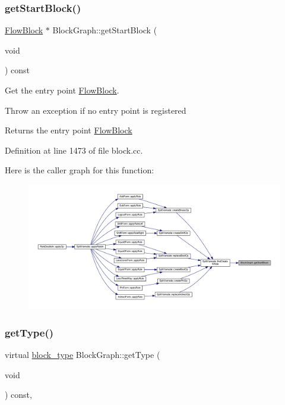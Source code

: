 \subsubsection{\texorpdfstring{getStartBlock()}{getStartBlock()}}
{\footnotesize\ttfamily \mbox{\hyperlink{class_flow_block}{Flow\+Block}} $\ast$ Block\+Graph\+::get\+Start\+Block (\begin{DoxyParamCaption}\item[{void}]{ }\end{DoxyParamCaption}) const}



Get the entry point \mbox{\hyperlink{class_flow_block}{Flow\+Block}}. 

Throw an exception if no entry point is registered \begin{DoxyReturn}{Returns}
the entry point \mbox{\hyperlink{class_flow_block}{Flow\+Block}} 
\end{DoxyReturn}


Definition at line 1473 of file block.\+cc.

Here is the caller graph for this function\+:
\nopagebreak
\begin{figure}[H]
\begin{center}
\leavevmode
\includegraphics[width=350pt]{class_block_graph_ae4f8f8599ed5e3eb803536f1c9595f09_icgraph}
\end{center}
\end{figure}
\mbox{\label{class_block_graph_a8e542e109e0acc977218ceaf3c248153}} 
\subsubsection{\texorpdfstring{getType()}{getType()}}
{\footnotesize\ttfamily virtual \mbox{\hyperlink{class_flow_block_a70df78390870fcdd51e31426ba6a193e}{block\+\_\+type}} Block\+Graph\+::get\+Type (\begin{DoxyParamCaption}\item[{void}]{ }\end{DoxyParamCaption}) const\hspace{0.3cm}{\ttfamily [inline]}, {\ttfamily [virtual]}}



